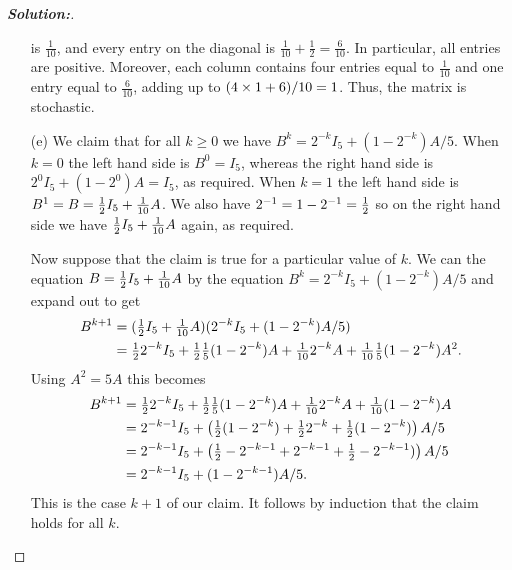 \documentclass[a4paper]{amsart}
\theoremstyle{definition}
\newenvironment{solution}{\begin{proof}[\textbf{Solution:}] \vphantom{u}}{\end{proof}}
\begin{document}
\begin{solution}
\begin{itemize}
   is $\frac{1}{10}$, and every entry on the diagonal is
   $\frac{1}{10}+\frac{1}{2}=\frac{6}{10}$.  In particular, all
   entries are positive.  Moreover, each column contains four entries
   equal to $\frac{1}{10}$ and one entry equal to $\frac{6}{10}$,
   adding up to $(4\times 1 + 6)/10=1$.  Thus, the matrix is stochastic.
  \item[(e)] We claim that for all $k\geq 0$ we have
   $B^k=2^{-k}I_5+(1-2^{-k})A/5$.  When $k=0$ the left hand side is
   $B^0=I_5$, whereas the right hand side is $2^0I_5+(1-2^0)A=I_5$, as
   required.  When $k=1$ the left hand side is
   $B^1=B=\tfrac{1}{2} I_5+\tfrac{1}{10}A$.  We also have
   $2^{-1}=1-2^{-1}=\tfrac{1}{2}$ so on the right hand side we have
   $\tfrac{1}{2} I_5+\frac{1}{10}A$ again, as required.

   Now suppose that the claim is true for a particular value of $k$.
   We can the equation $B=\tfrac{1}{2} I_5+\tfrac{1}{10}A$ by the equation
   $B^k=2^{-k}I_5+(1-2^{-k})A/5$ and expand out to get
   \begin{align*}
    B^{k+1} &= (\tfrac{1}{2} I_5+\tfrac{1}{10}A)(2^{-k}I_5+(1-2^{-k})A/5) \\
     &= \tfrac{1}{2} 2^{-k}I_5 + \tfrac{1}{2}\tfrac{1}{5}(1-2^{-k})A 
         + \tfrac{1}{10} 2^{-k}A
         + \tfrac{1}{10}\tfrac{1}{5}(1-2^{-k})A^2.
   \end{align*}
   Using $A^2=5A$ this becomes
   \begin{align*}
    B^{k+1} 
     &= \tfrac{1}{2} 2^{-k}I_5 + \tfrac{1}{2}\tfrac{1}{5}(1-2^{-k})A 
         + \tfrac{1}{10} 2^{-k}A
         + \tfrac{1}{10}(1-2^{-k})A \\
     &= 2^{-k-1}I_5 +
         \left(\tfrac{1}{2}(1-2^{-k})+\tfrac{1}{2} 2^{-k}+\tfrac{1}{2}(1-2^{-k})\right)A/5 \\
     &= 2^{-k-1}I_5 +
         \left(\tfrac{1}{2}-2^{-k-1}+2^{-k-1}+\tfrac{1}{2}-2^{-k-1})\right)A/5 \\
     &= 2^{-k-1}I_5 + (1-2^{-k-1})A/5.
   \end{align*}
   This is the case $k+1$ of our claim.  It follows by induction that
   the claim holds for all $k$.
 \end{itemize}
\end{solution}
\end{document}
